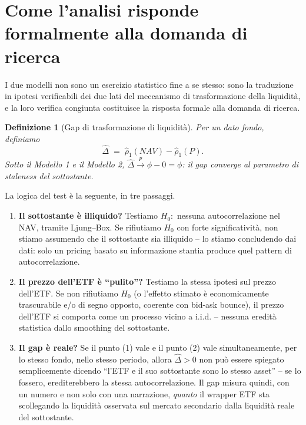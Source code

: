 \documentclass[11pt]{article}
\newtheorem{definition}{Definizione}
\begin{document}
\section{Come l'analisi risponde formalmente alla domanda di ricerca}
\label{sec:formal-answer}

I due modelli non sono un esercizio statistico fine a se stesso: sono la traduzione in ipotesi verificabili dei due lati del meccanismo di trasformazione della liquidit\`a, e la loro verifica congiunta costituisce la risposta formale alla domanda di ricerca.

\begin{definition}[Gap di trasformazione di liquidit\`a]
Per un dato fondo, definiamo
\[
\widehat{\Delta} \;=\; \hat\rho_1(NAV) - \hat\rho_1(P).
\]
Sotto il Modello 1 e il Modello 2, $\widehat{\Delta}\xrightarrow{p}\phi - 0 = \phi$: il gap converge al parametro di staleness del sottostante.
\end{definition}

La logica del test \`e la seguente, in tre passaggi.

\begin{enumerate}
\item \textbf{Il sottostante \`e illiquido?} Testiamo $H_0:$ nessuna autocorrelazione nel NAV, tramite Ljung--Box. Se rifiutiamo $H_0$ con forte significativit\`a, non stiamo assumendo che il sottostante sia illiquido -- lo stiamo concludendo dai dati: solo un pricing basato su informazione stantia produce quel pattern di autocorrelazione.
\item \textbf{Il prezzo dell'ETF \`e ``pulito''?} Testiamo la stessa ipotesi sul prezzo dell'ETF. Se non rifiutiamo $H_0$ (o l'effetto stimato \`e economicamente trascurabile e/o di segno opposto, coerente con bid-ask bounce), il prezzo dell'ETF si comporta come un processo vicino a i.i.d. -- nessuna eredit\`a statistica dallo smoothing del sottostante.
\item \textbf{Il gap \`e reale?} Se il punto (1) vale e il punto (2) vale simultaneamente, per lo stesso fondo, nello stesso periodo, allora $\widehat{\Delta} > 0$ non pu\`o essere spiegato semplicemente dicendo ``l'ETF e il suo sottostante sono lo stesso asset'' -- se lo fossero, erediterebbero la stessa autocorrelazione. Il gap misura quindi, con un numero e non solo con una narrazione, \emph{quanto} il wrapper ETF sta scollegando la liquidit\`a osservata sul mercato secondario dalla liquidit\`a reale del sottostante.
\end{enumerate}
\end{document}
